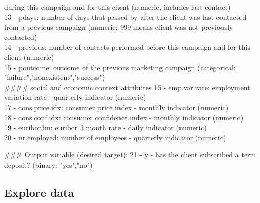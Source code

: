 \documentclass[11pt]{article}
\begin{document}
during this campaign and for this client (numeric, includes last
contact)\\
13 - pdays: number of days that passed by after the client was last
contacted from a previous campaign (numeric; 999 means client was not
previously contacted)\\
14 - previous: number of contacts performed before this campaign and for
this client (numeric)\\
15 - poutcome: outcome of the previous marketing campaign (categorical:
"failure","nonexistent","success")\\
\#\#\#\# social and economic context attributes 16 - emp.var.rate:
employment variation rate - quarterly indicator (numeric)\\
17 - cons.price.idx: consumer price index - monthly indicator
(numeric)\\
18 - cons.conf.idx: consumer confidence index - monthly indicator
(numeric)\\
19 - euribor3m: euribor 3 month rate - daily indicator (numeric)\\
20 - nr.employed: number of employees - quarterly indicator (numeric)

\#\#\# Output variable (desired target): 21 - y - has the client
subscribed a term deposit? (binary: "yes","no")

    \subsection{Explore data}\label{explore-data}
\end{document}
